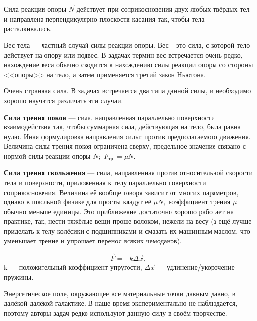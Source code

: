 \begin{definition}
Сила реакции опоры $\vec{N}$ действует при соприкосновении двух любых твёрдых
тел и направлена перпендикулярно плоскости касания так, чтобы тела расталкивались.
\end{definition}
\begin{definition}
Вес тела --- частный случай силы реакции опоры.
Вес -- это сила, с которой тело действует на опору или подвес.
В задачах термин вес встречается очень редко, нахождение веса обычно сводится
к нахождению силы реакции опоры со стороны <<опоры>> на тело, а затем применяется третий закон Ньютона.
\end{definition}
\begin{definition}
Очень странная сила. В задачах встречается два типа данной силы, и необходимо
хорошо научится различать эти случаи.\par
\textbf{Сила трения покоя} --- сила, направленная параллельно поверхности взаимодействия так,
чтобы суммарная сила, действующая на тело, была равна нулю. Иная формулировка направления силы:
против предполагаемого движения. Величина силы трения покоя ограничена сверху,
предельное значение связано с нормой силы реакции опоры $N;$ $F_\text{тр.} = \mu N.$
\par\textbf{Сила трения скольжения} --- сила, направленная против относительной скорости
тела и поверхности, приложенная к телу параллельно поверхности соприкосновения. Величина
её вообще говоря зависит от многих параметров, однако в школьной физике для просты
кладут её $\mu N,$ коэффициент трения $\mu$ обычно меньше единицы. Это приближение
достаточно хорошо работает на практике, так, нести тяжёлые вещи проще волоком,
нежели на весу (а ещё лучше приделать к телу колёсики с подшипниками и смазать их машинным маслом,
что уменьшает трение и упрощает перенос всяких чемоданов).
\end{definition}
\begin{definition}
$$\vec{F} = - k \Delta \vec{x},$$
k --- положительный коэффициент упругости, $\Delta \vec{x}$ --- удлинение/укорочение пружины.
\end{definition}
\begin{definition}
Энергетическое поле, окружающее все материальные точки
давным давно, в далёкой-далёкой галактике. В наше время экспериментально не
наблюдается, поэтому авторы задач редко используют данную силу в своём творчестве.
\end{definition}

